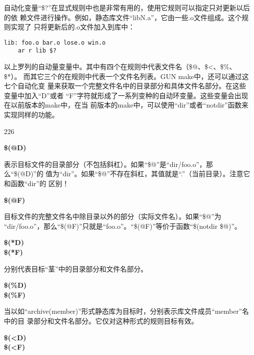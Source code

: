 自动化变量“\$?”在显式规则中也是非常有用的，使用它规则可以指定只对更新以后的依
赖文件进行操作。例如，静态库文件“libN.a”，它由一些.o文件组成。这个规则实现了
只将更新后的.o文件加入到库中：

\begin{Verbatim}[]
lib: foo.o bar.o lose.o win.o
    ar r lib $?
\end{Verbatim}

以上罗列的自动量变量中。其中有四个在规则中代表文件名（\$@、\$<、\$\%、\$*）。
而其它三个的在规则中代表一个文件名列表。GUN make中，还可以通过这七个自动化变
量来获取一个完整文件名中的目录部分和具体文件名部分。在这些变量中加入“D”或者
“F”字符就形成了一系列变种的自动环变量。这些变量会出现在以前版本的make中，在当
前版本的make中，可以使用“dir”或者“notdir”函数来实现同样的功能。


\begin{dinglist}{226}
\itemsep=4pt

\item \textbf{\$(@D)}

表示目标文件的目录部分（不包括斜杠）。如果“\$@”是“dir/foo.o”，那么“\$(@D)”的
值为“dir”。如果“\$@”不存在斜杠，其值就是“.”（当前目录）。注意它和函数“dir”的
区别！

\item \textbf{\$(@F)}

目标文件的完整文件名中除目录以外的部分（实际文件名）。如果“\$@”为
“dir/foo.o”，那么“\$(@F)”只就是“foo.o”。“\$(@F)”等价于函数“\$(notdir \$@)”。


  \item \begin{minipage}[t]{\linewidth}
          \textbf{\$(*D)} \\
          \textbf{\$(*F)}
        \end{minipage}


分别代表目标“茎”中的目录部分和文件名部分。

  \item \begin{minipage}[t]{\linewidth}
          \textbf{\$(\%D)} \\
          \textbf{\$(\%F)}
        \end{minipage}



当以如“archive(member)”形式静态库为目标时，分别表示库文件成员“member”名中的目
录部分和文件名部分。它仅对这种形式的规则目标有效。

  \item \begin{minipage}[t]{\linewidth}
          \textbf{\$(<D)} \\
          \textbf{\$(<F)}
        \end{minipage}



\end{dinglist}
